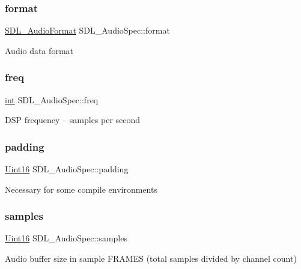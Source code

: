 \subsubsection{\texorpdfstring{format}{format}}
{\footnotesize\ttfamily \mbox{\hyperlink{_s_d_l__audio_8h_a491ed103fd25d920c4e6b7495217ce66}{S\+D\+L\+\_\+\+Audio\+Format}} S\+D\+L\+\_\+\+Audio\+Spec\+::format}

Audio data format \mbox{\label{struct_s_d_l___audio_spec_a8b823ce46fc2e448cf7e6fc141aff6b2}} 
\subsubsection{\texorpdfstring{freq}{freq}}
{\footnotesize\ttfamily \mbox{\hyperlink{warnings_8h_a74f207b5aa4ba51c3a2ad59b219a423b}{int}} S\+D\+L\+\_\+\+Audio\+Spec\+::freq}

D\+SP frequency -- samples per second \mbox{\label{struct_s_d_l___audio_spec_a738371fc13b54cefef4db16994abeeb6}} 
\subsubsection{\texorpdfstring{padding}{padding}}
{\footnotesize\ttfamily \mbox{\hyperlink{_s_d_l__stdinc_8h_a31fcc0a076c9068668173ee26d33e42b}{Uint16}} S\+D\+L\+\_\+\+Audio\+Spec\+::padding}

Necessary for some compile environments \mbox{\label{struct_s_d_l___audio_spec_a2cdf5e885808c10bfa2810b706e69f95}} 
\subsubsection{\texorpdfstring{samples}{samples}}
{\footnotesize\ttfamily \mbox{\hyperlink{_s_d_l__stdinc_8h_a31fcc0a076c9068668173ee26d33e42b}{Uint16}} S\+D\+L\+\_\+\+Audio\+Spec\+::samples}

Audio buffer size in sample F\+R\+A\+M\+ES (total samples divided by channel count) \mbox{\label{struct_s_d_l___audio_spec_addc462c8a806e6c122eccf63482048f6}} 
